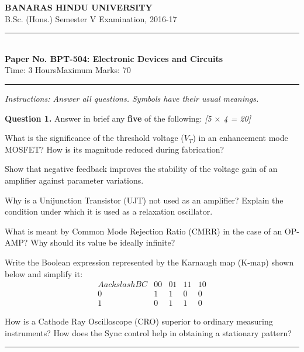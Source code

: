 \documentclass[11pt,a4paper]{article}
\newcommand{\pts}[1]{\hfill   \textit{[#1]}}
\begin{document}
\begin{center}
  {\large\bfseries BANARAS HINDU UNIVERSITY}\\[2pt]
  {\normalsize B.Sc. (Hons.) Semester V Examination, 2016-17}\\[6pt]
  \rule{0.8\linewidth}{0.5pt}\\[6pt]
  {\large\bfseries Paper No. BPT-504: Electronic Devices and Circuits}\\[4pt]
  {\normalsize Time: 3 Hours\hfill Maximum Marks: 70}
\end{center}
\rule{\linewidth}{0.4pt}
\smallskip



\noindent   \textit{Instructions: Answer all questions. Symbols have their usual meanings.}
\bigskip




\noindent   \textbf{Question 1.} Answer in brief any   \textbf{five} of the following: \pts{5 $ \times$ 4 = 20}

\begin{parts}
  \item What is the significance of the threshold voltage ($V_T$) in an enhancement mode MOSFET? How is its magnitude reduced during fabrication?
  \item Show that negative feedback improves the stability of the voltage gain of an amplifier against parameter variations.
  \item Why is a Unijunction Transistor (UJT) not used as an amplifier? Explain the condition under which it is used as a relaxation oscillator.
  \item What is meant by Common Mode Rejection Ratio (CMRR) in the case of an OP-AMP? Why should its value be ideally infinite?
  \item Write the Boolean expression represented by the Karnaugh map (K-map) shown below and simplify it:
    \[
    
\begin{array}{c|c|c|c|c}
      A ackslash BC & 00 & 01 & 11 & 10 \\ \hline
      0 & 1 & 1 & 0 & 0 \\ \hline
      1 & 0 & 1 & 1 & 0
    \end{array}
    \]
  \item How is a Cathode Ray Oscilloscope (CRO) superior to ordinary measuring instruments? How does the Sync control help in obtaining a stationary pattern?
\end{parts}

\medskip\rule{\linewidth}{0.2pt}
\end{document}
